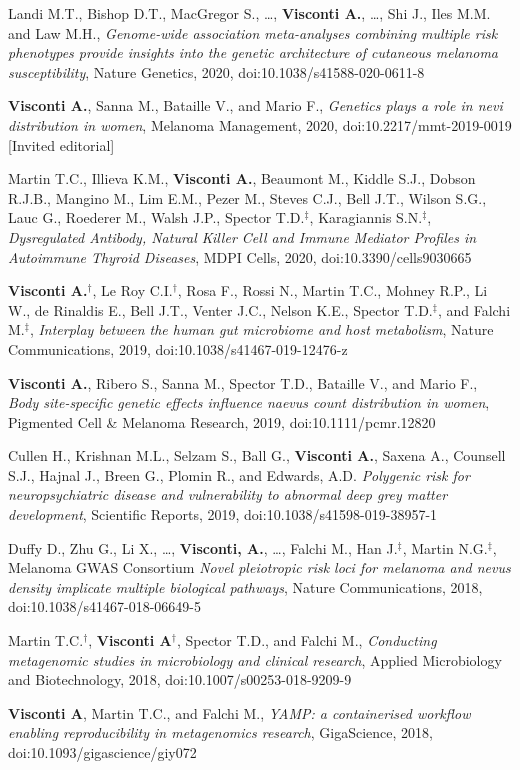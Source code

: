 \documentclass[a4paper,10pt]{article}
\begin{document}
{\begin{itemize}
		 Landi M.T., Bishop D.T., MacGregor S., \dots, \textbf{Visconti A.}, \dots, Shi J., Iles M.M. and Law M.H., \emph{Genome-wide association meta-analyses combining multiple risk phenotypes provide insights into the genetic architecture of cutaneous melanoma susceptibility}, Nature Genetics, 2020, doi:10.1038/s41588-020-0611-8

		 \textbf{Visconti A.}, Sanna M., Bataille V., and Mario F., \emph{Genetics plays a role in nevi distribution in women}, Melanoma Management, 2020, doi:10.2217/mmt-2019-0019 [Invited editorial]

		 Martin T.C., Illieva K.M., \textbf{Visconti A.}, Beaumont M., Kiddle S.J., Dobson R.J.B., Mangino M., Lim E.M., Pezer M., Steves C.J., Bell J.T., Wilson S.G., Lauc G., Roederer M., Walsh J.P., Spector T.D.$^{\textbf{$\ddag $}}$, Karagiannis S.N.$^{\textbf{$\ddag $}}$, \emph{Dysregulated Antibody, Natural Killer Cell and Immune Mediator Profiles in Autoimmune Thyroid Diseases}, MDPI Cells, 2020, doi:10.3390/cells9030665

		 \textbf{Visconti A.}$^{\textbf{$\dag $}}$, Le Roy C.I.$^{\textbf{$\dag $}}$, Rosa F., Rossi N., Martin T.C., Mohney R.P., Li W., de Rinaldis E., Bell J.T., Venter J.C., Nelson K.E., Spector T.D.$^{\textbf{$\ddag $}}$, and Falchi M.$^{\textbf{$\ddag $}}$, \emph{Interplay between the human gut microbiome and host metabolism}, Nature Communications, 2019, doi:10.1038/s41467-019-12476-z

		 \textbf{Visconti A.}, Ribero S., Sanna M., Spector T.D., Bataille V., and Mario F., \emph{Body site-specific genetic effects influence naevus count distribution in women}, Pigmented Cell \& Melanoma Research, 2019, doi:10.1111/pcmr.12820

		 Cullen H., Krishnan M.L., Selzam S., Ball G., \textbf{Visconti A.}, Saxena A., Counsell S.J., Hajnal J., Breen G., Plomin R., and Edwards, A.D. \emph{Polygenic risk for neuropsychiatric disease and vulnerability to abnormal deep grey matter development}, Scientific Reports, 2019, doi:10.1038/s41598-019-38957-1

		 Duffy D., Zhu G., Li X., \dots, \textbf{Visconti, A.}, \dots, Falchi M., Han J.$^{\textbf{$\ddag $}}$, Martin N.G.$^{\textbf{$\ddag $}}$, Melanoma GWAS Consortium \emph{Novel pleiotropic risk loci for melanoma and nevus density implicate multiple biological pathways}, Nature Communications, 2018, doi:10.1038/s41467-018-06649-5

		 Martin T.C.$^{\textbf{$\dag $}}$, \textbf{Visconti A}$^{\textbf{$\dag $}}$, Spector T.D., and Falchi M., \emph{Conducting metagenomic studies in microbiology and clinical research}, Applied Microbiology and Biotechnology, 2018, doi:10.1007/s00253-018-9209-9

		 \textbf{Visconti A}, Martin T.C., and Falchi M., \emph{YAMP: a containerised workflow enabling reproducibility in metagenomics research}, GigaScience, 2018, doi:10.1093/gigascience/giy072

	\end{itemize}
}
\end{document}
